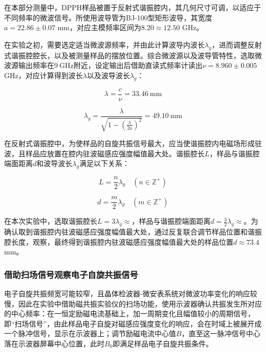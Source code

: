 \documentclass{thuemp}
\begin{document}
    在本部分测量中，DPPH样品被置于反射式谐振腔内，其几何尺寸可调，以适应于不同频率的微波信号。所使用波导管为BJ-100型矩形波导，其宽度$a=22.86\pm0.07$ \si{\milli\meter}，对应主模频率区间为$8.20 \approx 12.50$ \si{\giga\hertz}。
    
    在实验之初，需要选定适当微波源频率，并由此计算波导内波长$\lambda_g$，进而调整反射式谐振腔腔长，以及被测量样品的摆放位置。综合微波源以及波导管特性，选取微波源输出频率在$9~\text{GHz}$附近，设定输出后借助直读式频率计读出$\nu  = 8.960 \pm 0.005$ \si{\giga\hertz}，对应计算得到波长$\lambda$以及波导波长$\lambda_g$：
    
    \begin{equation}
    \lambda = \frac{c}{\nu} = 33.46 ~\text{mm}
    \end{equation}
    
    \begin{equation}
    \lambda_g = \frac{\lambda}{\sqrt{1 - \left(\frac{\lambda}{2a}\right)^2}} = 49.10 ~\text{mm}
    \end{equation}
    
    在反射式谐振腔中，为使样品的自旋共振信号最大，应当使谐振腔内电磁场形成驻波，且样品应放置在腔内驻波磁感应强度幅值最大处。谐振腔长$L$，样品与谐振腔端面距离$d$和波导波长$\lambda_g$满足以下关系：
    
    \begin{equation}
    L = \frac{n}{2}\lambda_g \quad (n \in \mathbb{Z}^+)
    \end{equation}
    
    \begin{equation}
    d = \frac{m}{2}\lambda_g \quad (m \in \mathbb{Z}^+)
    \end{equation}
    
    在本次实验中，选取谐振腔长$L=3\lambda_g\approx$，样品与谐振腔端面距离$d=\frac{3}{2}\lambda_g\approx$。为确认取到谐振腔内驻波磁感应强度幅值最大处，通过反复联合调节样品位置和谐振腔长度，观察，最终得到谐振腔内驻波磁感应强度幅值最大处的样品位置$d \approx 73.4 $\si{\milli\meter}。
    
    \subsubsection{借助扫场信号观察电子自旋共振信号}
    
    电子自旋共振频宽可能较窄，且晶体检波器-微安表系统对微波功率变化的响应较慢，因此在实验中借助磁共振实验仪的扫场功能，使用示波器确认共振发生所对应的中心频率：在一恒定励磁电流基础上，加一周期变化且幅值较小的周期信号，即“扫场信号”，由此样品电子自旋对磁感应强度变化的响应，会在时域上被展开成一个脉冲信号，显示在示波器上；调节励磁电流中心值$B$，直至这一脉冲信号中心落在示波器屏幕中心位置，此时$B_0$即满足样品电子自旋共振条件。
    
\end{document}
